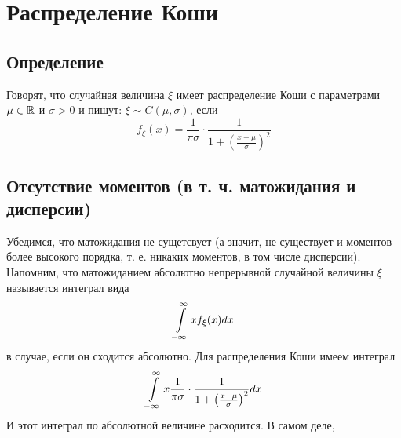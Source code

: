 \section{Распределение Коши}

\subsection{Определение}
Говорят, что случайная величина $\xi$ имеет распределение Коши с параметрами $\mu\in\mathbb{R}$ и $\sigma>0$ и пишут: $\xi\sim C(\mu,\sigma)$, если
\begin{equation}
f_\xi (x) = \frac{1}{\pi\sigma}\cdot \frac{1}{1+ \left( \frac{x-\mu}{\sigma} \right)  ^2}
\end{equation}

\subsection{Отсутствие моментов (в т. ч. матожидания и дисперсии)}
Убедимся, что матожидания не сущетсвует (а значит, не существует и моментов более высокого порядка, т. е. никаких моментов, в том числе дисперсии).
Напомним, что матожиданием абсолютно непрерывной случайной величины $\xi$ называется интеграл вида
\begin{equation}
 \int\limits_{-\infty }^{\infty } x f_\xi (x) dx
\end{equation}
в случае, если он сходится абсолютно.
Для распределения Коши имеем интеграл
\begin{equation}\label{matozhidanie_Koshi}
 \int\limits_{-\infty }^{\infty } x \frac{1}{\pi\sigma}\cdot \frac{1}{1+ \left( \frac{x-\mu}{\sigma} \right)  ^2} dx
\end{equation}
И этот интеграл по абсолютной величине расходится.
В самом деле,
